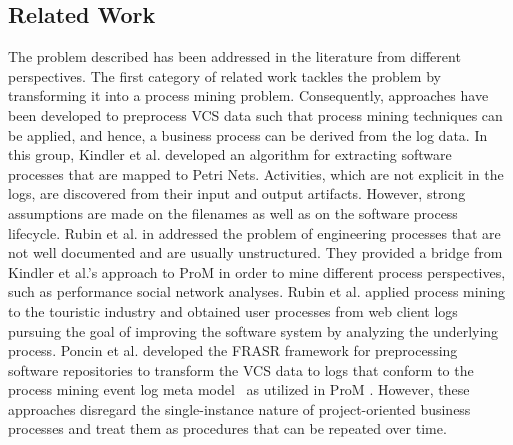 

\subsection{Related Work}
\label{sec:bpm2015related}

The problem described has been addressed in the literature from different perspectives. The first category of related work tackles the problem by transforming it into a process mining problem. Consequently, approaches have been developed to preprocess VCS data such that process mining techniques can be applied, and hence, a business process can be derived from the log data.
In this group, Kindler et al. \citep{Kindler2006,kindler2006incremental} developed an algorithm for extracting software processes that are mapped to Petri Nets. Activities, which are not explicit in the logs, are discovered from their input and output artifacts. However, strong assumptions are made on the filenames as well as on the software process lifecycle. %
Rubin et al. in \citep{rubin2007process} addressed the problem of engineering processes that are not well documented and are usually unstructured. They provided a bridge from Kindler et al.'s approach to ProM \citep{van2005prom} in order to mine different process perspectives, such as performance social network analyses. %
Rubin et al. \citep{rubin2014agile} applied process mining to the touristic industry and obtained user processes from web client logs pursuing the goal of improving the software system by analyzing the underlying process.
Poncin et al. \citep{Poncin2011a} developed the FRASR framework for preprocessing software repositories to transform the VCS data to logs that conform to the process mining event log meta model~\citep{van2005meta} as utilized in ProM \citep{van2005prom}.
However, these approaches disregard the single-instance nature of project-oriented business processes and treat them as procedures that can be repeated over time.

